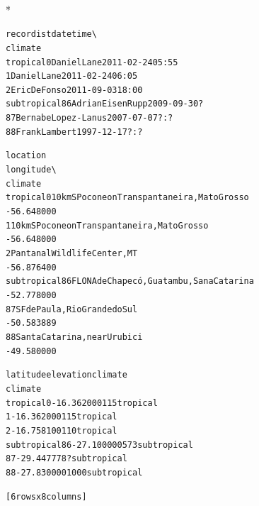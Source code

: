 \documentclass[letterpaper,10pt,english]{/usr/share/sphinx/texinputs/sphinxhowto}
\def\smaller{\fontsize{9.5pt}{9.5pt}\selectfont}
\newenvironment{InvisibleVerbatim}
        {\begin{mdframed}[leftmargin=0.1\linewidth,innerleftmargin=3pt,innerrightmargin=3pt, userdefinedwidth=1\linewidth, linewidth=0pt, linecolor=white, usetwoside=false]}
        {\end{mdframed}}
\begin{document}
                \makebox[0.1\linewidth]{\smaller\hfill\tt\color{nbframe-out-prompt}Out\hspace{4pt}{[}40{]}:\hspace{4pt}}\\*
                \vspace{-2.55\baselineskip}\begin{InvisibleVerbatim}
                \vspace{-0.5\baselineskip}
\begin{alltt}                          recordist        date   time  \textbackslash{}
climate
tropical    0           Daniel Lane  2011-02-24  05:55
            1           Daniel Lane  2011-02-24  06:05
            2          Eric DeFonso  2011-09-03  18:00
subtropical 86    Adrian Eisen Rupp  2009-09-30      ?
            87  Bernabe Lopez-Lanus  2007-07-07    ?:?
            88        Frank Lambert  1997-12-17    ?:?

                                                      location
longitude  \textbackslash{}
climate
tropical    0   10 km S Pocone on Transpantaneira, Mato Grosso
-56.648000
            1   10 km S Pocone on Transpantaneira, Mato Grosso
-56.648000
            2                     Pantanal Wildlife Center, MT
-56.876400
subtropical 86       FLONA de Chapecó, Guatambu, Sana Catarina
-52.778000
            87                  SF de Paula, Rio Grande do Sul
-50.583889
            88                    Santa Catarina, near Urubici
-49.580000

                 latitude elevation      climate
climate
tropical    0  -16.362000       115     tropical
            1  -16.362000       115     tropical
            2  -16.758100       110     tropical
subtropical 86 -27.100000       573  subtropical
            87 -29.447778         ?  subtropical
            88 -27.830000      1000  subtropical

[6 rows x 8 columns]\end{alltt}

            \end{InvisibleVerbatim}
            
        
    


\end{document}
